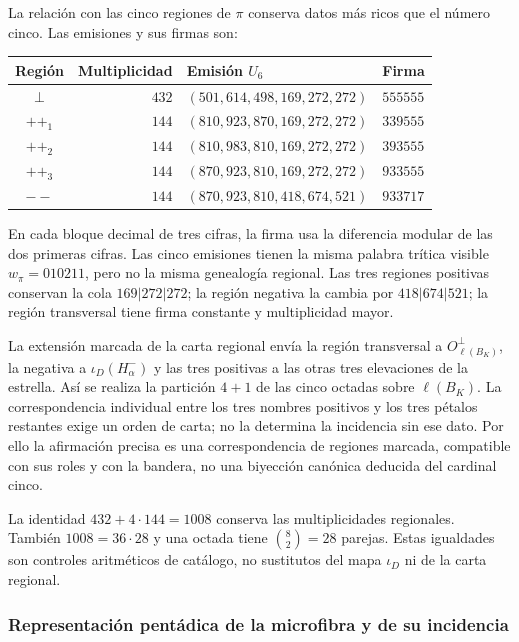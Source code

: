 La relación con las cinco regiones de $\pi$ conserva datos más ricos
que el número cinco. Las emisiones y sus firmas son:
\begin{center}
\small
\begin{tabular}{@{}crll@{}}
\toprule
Región & Multiplicidad & Emisión $U_6$ & Firma \\
\midrule
$\perp$ & $432$ & $(501,614,498,169,272,272)$ & $555555$ \\
$++_1$ & $144$ & $(810,923,870,169,272,272)$ & $339555$ \\
$++_2$ & $144$ & $(810,983,810,169,272,272)$ & $393555$ \\
$++_3$ & $144$ & $(870,923,810,169,272,272)$ & $933555$ \\
$--$ & $144$ & $(870,923,810,418,674,521)$ & $933717$ \\
\bottomrule
\end{tabular}
\end{center}
En cada bloque decimal de tres cifras, la firma usa la diferencia
modular de las dos primeras cifras. Las cinco emisiones tienen la
misma palabra trítica visible $w_\pi=010211$, pero no la misma
genealogía regional. Las tres regiones positivas conservan la cola
$169|272|272$; la región negativa la cambia por $418|674|521$;
la región transversal tiene firma constante y multiplicidad mayor.

La extensión marcada de la carta regional envía la región transversal
a $O_{\ell(B_K)}^\perp$, la negativa a $\iota_D(H^-_\alpha)$ y las
tres positivas a las otras tres elevaciones de la estrella. Así se
realiza la partición $4+1$ de las cinco octadas sobre $\ell(B_K)$.
La correspondencia individual entre los tres nombres positivos y
los tres pétalos restantes exige un orden de carta; no la determina
la incidencia sin ese dato. Por ello la afirmación precisa es una
correspondencia de regiones marcada, compatible con sus roles y con
la bandera, no una biyección canónica deducida del cardinal cinco.

La identidad $432+4\cdot144=1008$ conserva las multiplicidades
regionales. También $1008=36\cdot28$ y una octada tiene
$\binom82=28$ parejas. Estas igualdades son controles aritméticos de
catálogo, no sustitutos del mapa $\iota_D$ ni de la carta regional.


\subsubsection{Representación pentádica de la microfibra y de su incidencia}
\label{x_reciprocidad:pi-estrella:desarrollo}

